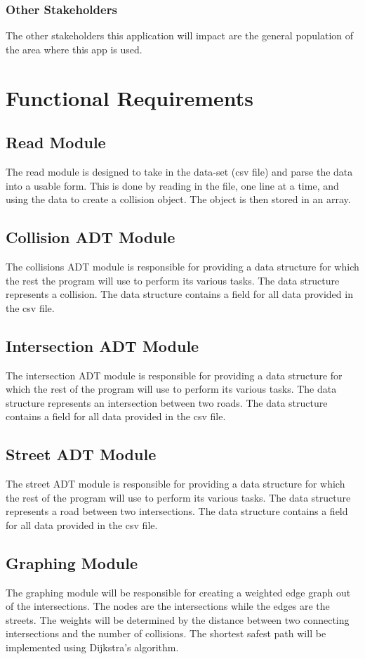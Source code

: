 \documentclass[12pt]{article}
\begin{document}
    \subsubsection{Other Stakeholders}
    The other stakeholders this application will impact are the general population of the area where this app is used.

\section{Functional Requirements}
\subsection{Read Module}
The read module is designed to take in the data-set (csv file) and parse the data into a usable form. This is done by reading in the file, one line at a time, and using the data to create a collision object. The object is then stored in an array.

\subsection{Collision ADT Module}
The collisions ADT module is responsible for providing a data structure for which the rest the program will use to perform its various tasks. The data structure represents a collision. The data structure contains a field for all data provided in the csv file.

\subsection{Intersection ADT Module}
The intersection ADT module is responsible for providing a data structure for which the rest of the program will use to perform its various tasks. The data structure represents an intersection between two roads. The data structure contains a field for all data provided in the csv file.

\subsection{Street ADT Module}
The street ADT module is responsible for providing a data structure for which the rest of the program will use to perform its various tasks. The data structure represents a road between two intersections. The data structure contains a field for all data provided in the csv file.

\subsection{Graphing Module}
The graphing module will be responsible for creating a weighted edge graph out of the intersections. The nodes are the intersections while the edges are the streets. The weights will be determined by the distance between two connecting intersections and the number of collisions. The shortest safest path will be implemented using Dijkstra's algorithm.
\end{document}
